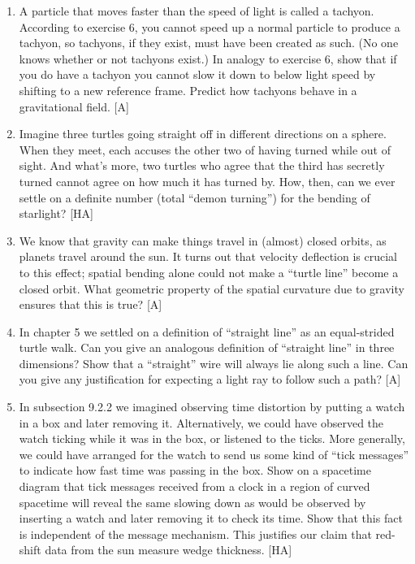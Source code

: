 \documentclass{book}
\begin{document}
\begin{enumerate}
\item A particle that moves faster than the speed of light is called a
tachyon. According to exercise 6, you cannot speed up a normal particle
to produce a tachyon, so tachyons, if they exist, must have been created
as such. (No one knows whether or not tachyons exist.) In analogy to
exercise 6, show that if you do have a tachyon you cannot slow it down
to below light speed by shifting to a new reference frame. Predict how
tachyons behave in a gravitational field. [A]

\item Imagine three turtles going straight off in different directions on a
sphere. When they meet, each accuses the other two of having turned
while out of sight. And what's more, two turtles who agree that the third
has secretly turned cannot agree on how much it has turned by. How,
then, can we ever settle on a definite number (total ``demon turning'')
for the bending of starlight? [HA]

\item We know that gravity can make things travel in (almost) closed orbits,
as planets travel around the sun. It turns out that velocity deflection
is crucial to this effect; spatial bending alone could not make a ``turtle
line'' become a closed orbit. What geometric property of the spatial
curvature due to gravity ensures that this is true? [A]

\item In chapter 5 we settled on a definition of ``straight line'' as an equal-strided turtle walk. Can you give an analogous definition of ``straight
line'' in three dimensions? Show that a ``straight'' wire will always lie
along such a line. Can you give any justification for expecting a light
ray to follow such a path? [A]

\item In subsection 9.2.2 we imagined observing time distortion by putting
a watch in a box and later removing it. Alternatively, we could have
observed the watch ticking while it was in the box, or listened to the
ticks. More generally, we could have arranged for the watch to send
us some kind of ``tick messages'' to indicate how fast time was passing
in the box. Show on a spacetime diagram that tick messages received
from a clock in a region of curved spacetime will reveal the same slowing
down as would be observed by inserting a watch and later removing it
to check its time. Show that this fact is independent of the message
mechanism. This justifies our claim that red-shift data from the sun
measure wedge thickness. [HA]


\end{enumerate}
\end{document}
